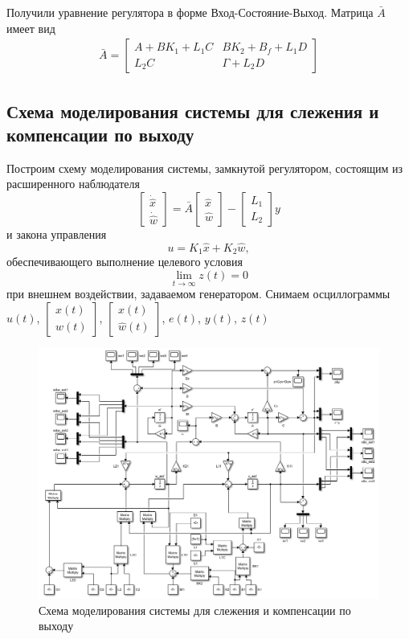 \documentclass[a4paper, 12pt]{article}
\begin{document}
    Получили уравнение регулятора в форме Вход-Состояние-Выход. Матрица $\bar{A}$ имеет вид
    \begin{align}
        \bar{A}=\begin{bmatrix}
            A+BK_1+L_1C &BK_2+B_f+L_1D\\
            L_2C &\Gamma+L_2D
        \end{bmatrix}\label{eq:barA}
    \end{align}


    \subsection{Схема моделирования системы для слежения и компенсации по выходу}
    Построим схему моделирования системы, замкнутой регулятором, состоящим из расширенного наблюдателя
    $$
    \begin{bmatrix}
        \dot{\hat{x}}\\ \dot{\hat{ w}}
    \end{bmatrix}=\bar{A}\begin{bmatrix}
        \hat{x}\\ \hat{ w}
    \end{bmatrix}-\begin{bmatrix}
        L_1\\L_2
    \end{bmatrix}y
    $$
    и закона управления
    $$
    u=K_1\hat{x}+K_2\hat{ w},
    $$
    обеспечивающего выполнение целевого условия
    $$
    \lim\limits_{t\to\infty}z(t)=0
    $$
    при внешнем воздействии, задаваемом генератором. Снимаем осциллограммы
    $u(t)$, $\begin{bmatrix}
        x(t)\\  w(t)
    \end{bmatrix}$, $\begin{bmatrix}
        \hat{x}(t)\\ \hat{ w}(t)
    \end{bmatrix}$, $e(t)$, $y(t)$, $z(t)$
    \begin{figure}[H]
        \centering
        \includegraphics[scale=0.55]{3task_scheme.png}
        \captionsetup{skip=0pt}
        \caption{Схема моделирования системы для слежения и компенсации по выходу}
        \label{fig:3task_scheme}
    \end{figure}
\end{document}

